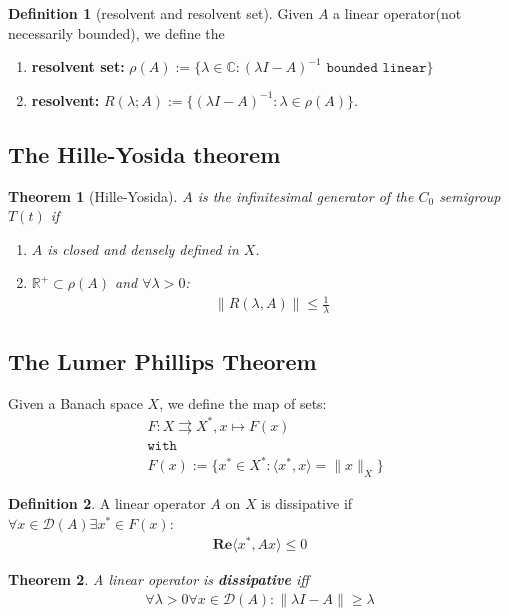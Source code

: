 \documentclass[a4paper,11pt,fleqn]{book}
\newtheorem{theorem}{Theorem}[section]
\theoremstyle{definition}
\newtheorem{definition}{Definition}[section]
\theoremstyle{remark}
\begin{document}
\begin{definition}[resolvent and resolvent set]
	Given $A$ a linear operator(not necessarily bounded), we define the 
	\begin{enumerate}
		\item \textbf{resolvent set:} $\rho(A):= \{ \lambda \in \mathbb{C}: (\lambda I - A)^{-1} \texttt{ bounded linear} \}$
		\item \textbf{resolvent:} $R(\lambda; A):= \{ (\lambda I - A)^{-1}: \lambda \in \rho(A)\}$.
	\end{enumerate}
\end{definition}


\subsection{The Hille-Yosida theorem}
\begin{theorem}[Hille-Yosida]
	$A$ is the infinitesimal generator of the $C_0$ semigroup $T(t)$ if
	\begin{enumerate}
		\item $A$ is closed and densely defined in $X$. 
		\item $\mathbb{R}^+ \subset \rho(A)$ and $\forall \lambda >0$:
		\begin{align*}
			\|R(\lambda, A)\| \le \frac{1}{\lambda} 
		\end{align*}
	\end{enumerate}
\end{theorem}

\subsection{The Lumer Phillips Theorem}
Given a Banach space $X$, we define the map of sets:
\begin{align*}
	& F: X \rightrightarrows X^*, x \mapsto F(x)\\
	& \texttt{with}\\
	& F(x):= \{x^* \in X^*: \langle x^*, x\rangle = \|x\|_X \}
\end{align*}

\begin{definition}
	A linear operator $A$ on $X$ is dissipative if $\forall x \in \mathcal{D}(A) \exists x^* \in F(x):$
	\begin{align*}
		\textbf{Re} \langle x^*,   Ax \rangle \le 0
	\end{align*}
\end{definition}

\begin{theorem}
	A linear operator is \textbf{dissipative} iff
	\begin{align*}
		\forall \lambda > 0 \forall x \in \mathcal{D}(A): \|\lambda I - A\| \ge \lambda
	\end{align*}
\end{theorem}
 
\end{document}
